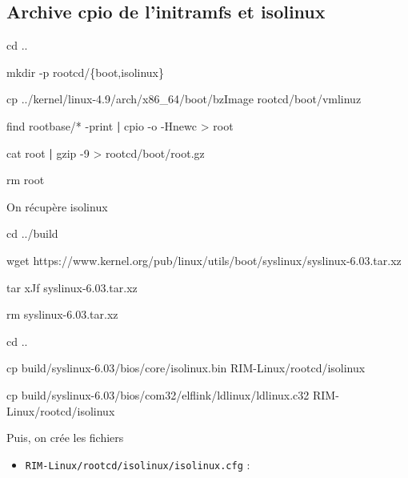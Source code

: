 \documentclass[]{article}
\newenvironment{Shaded}{}{}
\newcommand{\KeywordTok}[1]{\textcolor[rgb]{0.00,0.44,0.13}{\textbf{{#1}}}}
\newcommand{\DataTypeTok}[1]{\textcolor[rgb]{0.56,0.13,0.00}{{#1}}}
\newcommand{\FunctionTok}[1]{\textcolor[rgb]{0.02,0.16,0.49}{{#1}}}
\newcommand{\OperatorTok}[1]{\textcolor[rgb]{0.40,0.40,0.40}{{#1}}}
\newcommand{\BuiltInTok}[1]{{#1}}
\newcommand{\NormalTok}[1]{{#1}}
\providecommand{\tightlist}{%
  \setlength{\itemsep}{0pt}\setlength{\parskip}{0pt}}
\begin{document}
\subsection{Archive cpio de l'initramfs et
isolinux}\label{archive-cpio-de-linitramfs-et-isolinux}

\begin{Shaded}
\begin{Highlighting}[]
\BuiltInTok{cd} \NormalTok{..}

\FunctionTok{mkdir} \NormalTok{-p rootcd/}\DataTypeTok{\{boot,isolinux\}}

\FunctionTok{cp} \NormalTok{../kernel/linux-4.9/arch/x86_64/boot/bzImage rootcd/boot/vmlinuz}

\FunctionTok{find} \NormalTok{rootbase/* -print }\KeywordTok{|} \FunctionTok{cpio} \NormalTok{-o -Hnewc }\OperatorTok{>} \NormalTok{root}

\FunctionTok{cat} \NormalTok{root }\KeywordTok{|} \FunctionTok{gzip} \NormalTok{-9 }\OperatorTok{>} \NormalTok{rootcd/boot/root.gz}

\FunctionTok{rm} \NormalTok{root}
\end{Highlighting}
\end{Shaded}

On récupère isolinux

\begin{Shaded}
\begin{Highlighting}[]

\BuiltInTok{cd} \NormalTok{../build}

\FunctionTok{wget} \NormalTok{https://www.kernel.org/pub/linux/utils/boot/syslinux/syslinux-6.03.tar.xz}

\FunctionTok{tar} \NormalTok{xJf syslinux-6.03.tar.xz}

\FunctionTok{rm} \NormalTok{syslinux-6.03.tar.xz}

\BuiltInTok{cd} \NormalTok{..}

\FunctionTok{cp} \NormalTok{build/syslinux-6.03/bios/core/isolinux.bin RIM-Linux/rootcd/isolinux}

\FunctionTok{cp} \NormalTok{build/syslinux-6.03/bios/com32/elflink/ldlinux/ldlinux.c32 RIM-Linux/rootcd/isolinux}
\end{Highlighting}
\end{Shaded}

Puis, on crée les fichiers

\begin{itemize}
\tightlist
\item
  \texttt{RIM-Linux/rootcd/isolinux/isolinux.cfg} :
\end{itemize}
\end{document}
